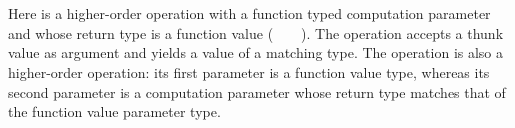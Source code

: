 \begin{code}[hide]%
%
\>[6]\AgdaSpace{}%
\AgdaSymbol{\{}\AgdaSymbol{\}}\AgdaSpace{}%
\AgdaSymbol{\{}\AgdaSymbol{\}}\AgdaSpace{}%
\AgdaSpace{}%
\AgdaSymbol{=}\AgdaSpace{}%
\AgdaSpace{}%
\AgdaSymbol{(}\AgdaSpace{}%
\AgdaSymbol{\{}\AgdaSpace{}%
\AgdaSymbol{=}\AgdaSpace{}%
\AgdaSpace{}%
\AgdaSymbol{\AgdaUnderscore{}\}}\AgdaSpace{}%
\AgdaSymbol{(}\AgdaSpace{}%
\AgdaSymbol{\{}\AgdaSymbol{\}}\AgdaSpace{}%
\AgdaSymbol{\{}\AgdaSymbol{\}}\AgdaSpace{}%
\AgdaOperator{\AgdaInductiveConstructor{,}}\AgdaSpace{}%
\AgdaSpace{}%
\AgdaOperator{\AgdaInductiveConstructor{,}}\AgdaSpace{}%
\AgdaSymbol{))}\<%
\\
%
\>[6]\AgdaSpace{}%
\AgdaSpace{}%
\AgdaSymbol{=}\AgdaSpace{}%
\AgdaSpace{}%
\AgdaSymbol{(}\AgdaSpace{}%
\AgdaSymbol{\{}\AgdaSpace{}%
\AgdaSymbol{=}\AgdaSpace{}%
\AgdaSpace{}%
\AgdaSymbol{\AgdaUnderscore{}\}}\AgdaSpace{}%
\AgdaSymbol{(}\AgdaSpace{}%
\AgdaSpace{}%
\AgdaOperator{\AgdaInductiveConstructor{,}}\AgdaSpace{}%
\AgdaSpace{}%
\AgdaOperator{\AgdaInductiveConstructor{,}}\AgdaSpace{}%
\AgdaSpace{}%
\AgdaSymbol{()))}\<%
\\
%
\>[6]\AgdaSpace{}%
\AgdaSpace{}%
\AgdaSpace{}%
\AgdaSymbol{=}\AgdaSpace{}%
\AgdaSpace{}%
\AgdaSymbol{(}\AgdaSpace{}%
\AgdaSymbol{\{}\AgdaSpace{}%
\AgdaSymbol{=}\AgdaSpace{}%
\AgdaSpace{}%
\AgdaSymbol{\AgdaUnderscore{}\}}\AgdaSpace{}%
\AgdaSymbol{(}\AgdaSpace{}%
\AgdaSpace{}%
\AgdaOperator{\AgdaInductiveConstructor{,}}\AgdaSpace{}%
\AgdaSpace{}%
\AgdaOperator{\AgdaInductiveConstructor{,}}\AgdaSpace{}%
\AgdaSpace{}%
\AgdaBound{\AgdaUnderscore{}}\AgdaSpace{}%
\AgdaSpace{}%
\AgdaSymbol{))}\<%
\end{code}
%
Here  is a higher-order operation with a function typed computation parameter and whose return type is a function value (~~~~).
The  operation accepts a thunk value as argument and yields a value of a matching type.
The  operation is also a higher-order operation: its first parameter is a function value type, whereas its second parameter is a computation parameter whose return type matches that of the function value parameter type.

